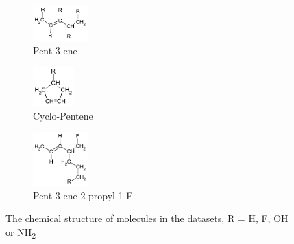 \documentclass[twoside,11pt]{article}
\begin{document}
\begin{figure}[h!]
\centering
\begin{subfigure}{.3\textwidth}
  \centering
  \includegraphics[width=80px]{pent3ene.pdf}
  \caption{Pent-3-ene}
  \label{fig:pent3ene}
\end{subfigure}%
\begin{subfigure}{.3\textwidth}
  \centering
  \includegraphics[width=60px]{RcycloPenteneHs.pdf}
  \caption{Cyclo-Pentene}
  \label{fig:cycloPen}
\end{subfigure}
\begin{subfigure}{.3\textwidth}
  \centering
  \includegraphics[width=80px]{pent3ene2propNOF.pdf}
  \caption{Pent-3-ene-2-propyl-1-F}
  \label{fig:propSub}
\end{subfigure}
\caption{The chemical structure of molecules in the datasets, R = H, F, OH or NH\textsubscript{2}}
\label{fig:Molecules}
\end{figure}
\end{document}

